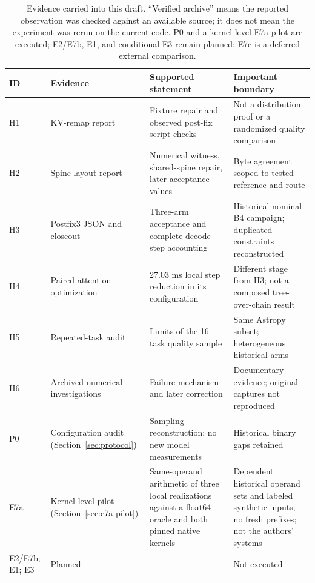 \documentclass[conference]{IEEEtran}
\begin{document}
\begin{table}[t]
\caption{Evidence carried into this draft. ``Verified archive'' means the reported observation was checked against an available source; it does not mean the experiment was rerun on the current code. P0 and a kernel-level E7a pilot are executed; E2/E7b, E1, and conditional E3 remain planned; E7c is a deferred external comparison.}
\label{tab:evidence}
\centering\footnotesize
\begin{tabularx}{\textwidth}{@{}p{}p{}Yp{0.25\textwidth}@{}}
\toprule
ID & Evidence & Supported statement & Important boundary \\
\midrule
H1 & KV-remap report~\cite{lumo2026stateless} & Fixture repair and observed post-fix script checks & Not a distribution proof or a randomized quality comparison \\
H2 & Spine-layout report~\cite{lumo2026spine} & Numerical witness, shared-spine repair, later acceptance values & Byte agreement scoped to tested reference and route \\
H3 & Postfix3 JSON and closeout~\cite{lumo2026archive} & Three-arm acceptance and complete decode-step accounting & Historical nominal-B4 campaign; duplicated constraints reconstructed \\
H4 & Paired attention optimization~\cite{lumo2026paired} & 27.03 ms local step reduction in its configuration & Different stage from H3; not a composed tree-over-chain result \\
H5 & Repeated-task audit~\cite{lumo2026archive} & Limits of the 16-task quality sample & Same Astropy subset; heterogeneous historical arms \\
H6 & Archived numerical investigations & Failure mechanism and later correction & Documentary evidence; original captures not reproduced \\
P0 & Configuration audit (Section~\ref{sec:protocol}) & Sampling reconstruction; no new model measurements & Historical binary gaps retained \\
E7a & Kernel-level pilot (Section~\ref{sec:e7a-pilot}) & Same-operand arithmetic of three local realizations against a float64 oracle and both pinned native kernels & Dependent historical operand sets and labeled synthetic inputs; no fresh prefixes; not the authors' systems \\
E2/E7b; E1; E3 & Planned & --- & Not executed \\
\bottomrule
\end{tabularx}
\end{table}
\end{document}
